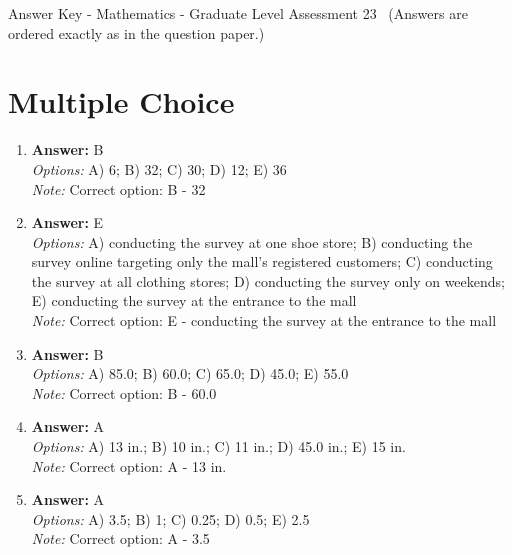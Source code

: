 \documentclass[12pt]{article}
\begin{document}
\begin{center}
Answer Key - Mathematics - Graduate Level Assessment 23 \
\small (Answers are ordered exactly as in the question paper.)
\end{center}

\section*{Multiple Choice}
\begin{enumerate}[label=\arabic*.]
\item \textbf{Answer:} B
\\ \textit{Options:} A) 6; B) 32; C) 30; D) 12; E) 36
\\ \textit{Note:} Correct option: B - 32
\item \textbf{Answer:} E
\\ \textit{Options:} A) conducting the survey at one shoe store; B) conducting the survey online targeting only the mall's registered customers; C) conducting the survey at all clothing stores; D) conducting the survey only on weekends; E) conducting the survey at the entrance to the mall
\\ \textit{Note:} Correct option: E - conducting the survey at the entrance to the mall
\item \textbf{Answer:} B
\\ \textit{Options:} A) 85.0; B) 60.0; C) 65.0; D) 45.0; E) 55.0
\\ \textit{Note:} Correct option: B - 60.0
\item \textbf{Answer:} A
\\ \textit{Options:} A) 13 in.; B) 10 in.; C) 11 in.; D) 45.0 in.; E) 15 in.
\\ \textit{Note:} Correct option: A - 13 in.
\item \textbf{Answer:} A
\\ \textit{Options:} A) 3.5; B) 1; C) 0.25; D) 0.5; E) 2.5
\\ \textit{Note:} Correct option: A - 3.5
\end{enumerate}
\end{document}
